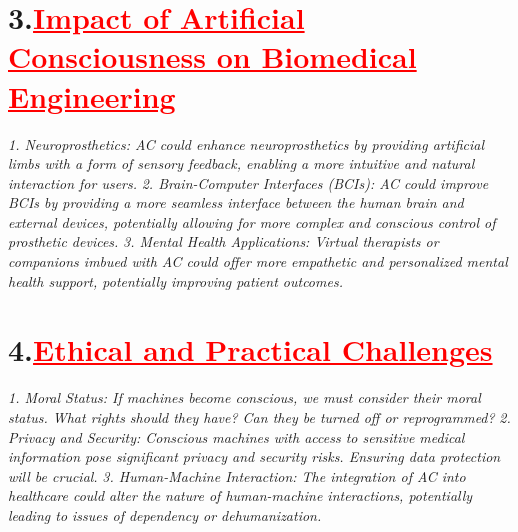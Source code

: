 \documentclass[12pt]{article}
\begin{document}
\section*{\textbf{3.\hspace{1cm}\textcolor{red}{\underline{\large{Impact of Artificial Consciousness on Biomedical Engineering}}}}}
\hspace{1cm}\large{\emph{1. Neuroprosthetics: AC could enhance neuroprosthetics by providing artificial limbs with a form of sensory feedback, enabling a more intuitive and natural interaction for users.}}\vspace{1cm}\newline
\hspace{1cm}\large{\emph{2. Brain-Computer Interfaces (BCIs): AC could improve BCIs by providing a more seamless interface between the human brain and external devices, potentially allowing for more complex and conscious control of prosthetic devices.}}\vspace{1cm}\newline
\hspace{1cm}\large{\emph{3. Mental Health Applications: Virtual therapists or companions imbued with AC could offer more empathetic and personalized mental health support, potentially improving patient outcomes.}}\vspace{1cm}\newline
\section*{\textbf{4.\hspace{1cm}\textcolor{red}{\underline{\large{Ethical and Practical Challenges}}}}}
\hspace{1cm}\large{\emph{1. Moral Status: If machines become conscious, we must consider their moral status. What rights should they have? Can they be turned off or reprogrammed?}}\vspace{1cm}\newline
\hspace{1cm}\large{\emph{2. Privacy and Security: Conscious machines with access to sensitive medical information pose significant privacy and security risks. Ensuring data protection will be crucial.}}\vspace{1cm}\newline
\hspace{1cm}\large{\emph{3. Human-Machine Interaction: The integration of AC into healthcare could alter the nature of human-machine interactions, potentially leading to issues of dependency or dehumanization.}}\vspace{1cm}\newline
\end{document}
